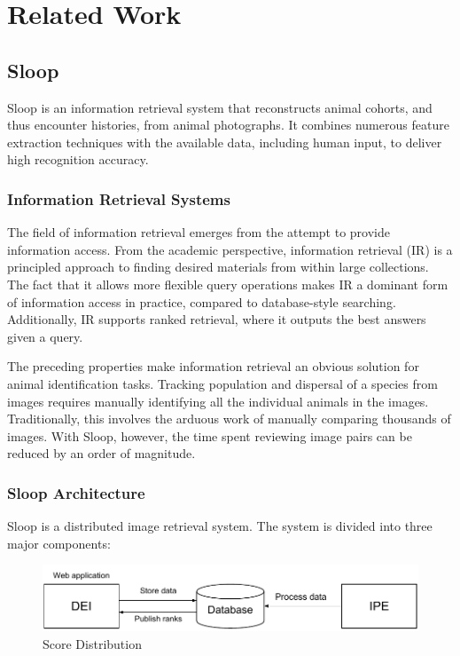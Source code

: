 \graphicspath{{./images/chap2/}}
\chapter{Related Work} %
\label{cha:related_work}

\section{Sloop}

Sloop is an information retrieval system that reconstructs animal cohorts, and thus
encounter histories, from animal photographs. It combines numerous feature
extraction techniques with the available data, including human input, to deliver
high recognition accuracy.

  \subsection{Information Retrieval Systems}

  The field of information retrieval emerges from the attempt to provide
  information access. From the academic perspective, information retrieval (IR)
  is a principled approach to finding desired materials
  from within large collections. The fact that it allows more flexible
  query operations makes IR a dominant form of information access in practice,
  compared to database-style searching. Additionally, IR supports ranked
  retrieval, where it outputs the best answers given a query.

  The preceding properties make information retrieval an obvious solution for
  animal identification tasks. Tracking population and dispersal of a species from
  images requires manually identifying all the individual animals in the images.
  Traditionally, this involves the arduous work of manually comparing thousands
  of images. With Sloop, however, the time spent reviewing image pairs can be
  reduced by an order of magnitude.

  \subsection{Sloop Architecture} Sloop is a distributed image retrieval system.
  The system is divided into three major components:

  \begin{figure}[htb]
    \centering
    \includegraphics[width=\textwidth]{sloop/system}
    \caption{Score Distribution}
    \label{fig:sloop_overview} %
  \end{figure}

